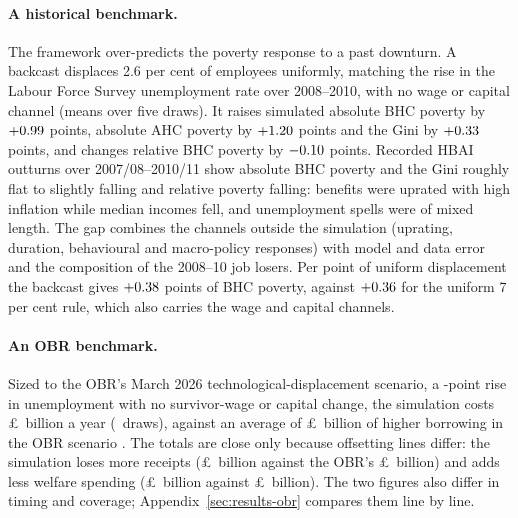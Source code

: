 \paragraph{A historical benchmark.} The framework over-predicts the poverty response to a past downturn. A backcast displaces 2.6 per cent of employees uniformly, matching the rise in the Labour Force Survey unemployment rate over 2008--2010, with no wage or capital channel (means over five draws). It raises simulated absolute BHC poverty by $+0.99$ points, absolute AHC poverty by $+1.20$ points and the Gini by $+0.33$ points, and changes relative BHC poverty by $-0.10$ points. Recorded HBAI outturns over 2007/08--2010/11 show absolute BHC poverty and the Gini roughly flat to slightly falling and relative poverty falling: benefits were uprated with high inflation while median incomes fell, and unemployment spells were of mixed length. The gap combines the channels outside the simulation (uprating, duration, behavioural and macro-policy responses) with model and data error and the composition of the 2008--10 job losers. Per point of uniform displacement the backcast gives $+0.38$ points of BHC poverty, against $+0.36$ for the uniform 7 per cent rule, which also carries the wage and capital channels.

\paragraph{An OBR benchmark.} Sized to the OBR's March 2026 technological-displacement scenario, a \genObrUnempRisePp-point rise in unemployment with no survivor-wage or capital change, the simulation costs \pounds\genObrCostMeanBn~billion a year (\genObrDraws~draws), against an average of \pounds\genObrBorrowingBn~billion of higher borrowing in the OBR scenario \citep[para.~6.18]{obr2026}. The totals are close only because offsetting lines differ: the simulation loses more receipts (\pounds\genObrReceiptsBn~billion against the OBR's \pounds\genObrReceiptsLostBn~billion) and adds less welfare spending (\pounds\genObrWelfareBn~billion against \pounds\genObrWelfareAddedBn~billion). The two figures also differ in timing and coverage; Appendix~\ref{sec:results-obr} compares them line by line.

